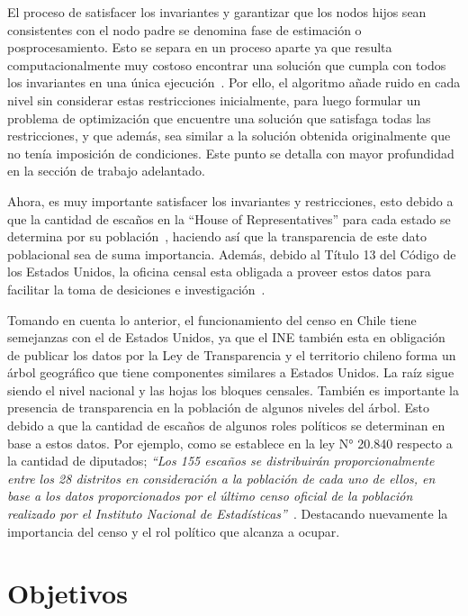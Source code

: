 \documentclass[informe]{upropuesta}
\begin{document}
El proceso de satisfacer los invariantes y garantizar que los nodos hijos sean consistentes con el nodo padre se denomina fase de estimación o posprocesamiento. Esto se separa en un proceso aparte ya que resulta computacionalmente muy costoso encontrar una solución que cumpla con todos los invariantes en una única ejecución~\cite{Abowd2022}. Por ello, el algoritmo añade ruido en cada nivel sin considerar estas restricciones inicialmente, para luego formular un problema de optimización que encuentre una solución que satisfaga todas las restricciones, y que además, sea similar a la solución obtenida originalmente que no tenía imposición de condiciones. Este punto se detalla con mayor profundidad en la sección de trabajo adelantado.

Ahora, es muy importante satisfacer los invariantes y restricciones, esto debido a que la cantidad de escaños en la “House of Representatives” para cada estado se determina por su población~\cite{CensusApportionment2024}, haciendo así que la transparencia de este dato poblacional sea de suma importancia. Además, debido al Título 13 del Código de los Estados Unidos, la oficina censal esta obligada a proveer estos datos para facilitar la toma de desiciones e investigación~\cite{USCodeTitle13}.

Tomando en cuenta lo anterior, el funcionamiento del censo en Chile tiene semejanzas con el de Estados Unidos, ya que el INE también esta en obligación de publicar los datos por la Ley de Transparencia y el territorio chileno forma un árbol geográfico que tiene componentes similares a Estados Unidos. La raíz sigue siendo el nivel nacional y las hojas los bloques censales. También es importante la presencia de transparencia en la población de algunos niveles del árbol. Esto debido a que la cantidad de escaños de algunos roles políticos se determinan en base a estos datos. Por ejemplo, como se establece en la ley N° 20.840 respecto a la cantidad de diputados; \textit{“Los 155 escaños se distribuirán proporcionalmente entre los 28 distritos en consideración a la población de cada uno de ellos, en base a los datos proporcionados por el último censo oficial de la población realizado por el Instituto Nacional de Estadísticas”}~\cite{Ley20840}. Destacando nuevamente la importancia del censo y el rol político que alcanza a ocupar.


\section{Objetivos}\label{chap:obj}
\end{document}
